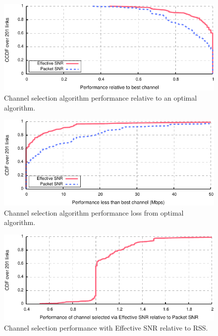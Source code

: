 \begin{figure}[p]
	\centering
	\includegraphics[width=\textwidth]{figures/applications/chan_sel_ratio_opt.pdf}
	\caption{\label{fig:chan_sel_ratio_opt}Channel selection algorithm performance relative to an optimal algorithm.}
\end{figure}
\begin{figure}[p]
	\centering
	\includegraphics[width=\textwidth]{figures/applications/chan_sel_diff_opt.pdf}
	\caption{\label{fig:chan_sel_delta_opt}Channel selection algorithm performance loss from optimal algorithm.}
\end{figure}
\begin{figure}[p]
	\centering
	\includegraphics[width=\textwidth]{figures/applications/chan_sel_ratio.pdf}
	\caption{\label{fig:chan_sel_ratio}Channel selection performance with Effective SNR relative to RSS\@.}
\end{figure}

